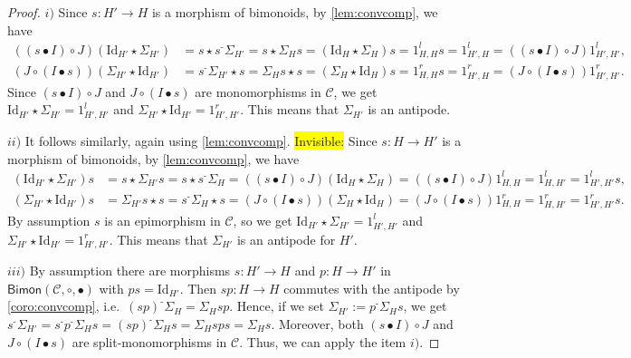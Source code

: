 \documentclass[nosumlimits,twoside]{amsart}
\theoremstyle{definition}
\theoremstyle{remark}
\def\revsn{\text{-}}
\newenvironment{invisible}{{\noindent\sc \colorbox{yellow}{Invisible:}\;}\color{gray}}{\medskip}
\newcommand{\id}{\mathrm{Id}}
\newcommand{\Cc}{\mathcal{C}}
\begin{document}
\begin{proof}
$i)$ Since $s:H'\to H$ is a morphism of bimonoids, by \cref{lem:convcomp}, we have%
\begin{align*}
\left( \left( s\bullet I\right) \circ J\right) \left( \mathrm{Id}_{H'}\star
\Sigma _{H'}\right)  &=s\star s^{\revsn }\Sigma _{H'}=s\star \Sigma _{H}s=\left(
\mathrm{Id}_{H}\star \Sigma _{H}\right) s=1_{H,H}^{l}s=1_{H',H}^{l}=\left(
\left( s\bullet I\right) \circ J\right) 1_{H',H'}^{l}, \\
\left( J\circ \left( I\bullet s\right) \right) \left( \Sigma _{H'}\star
\mathrm{Id}_{H'}\right)  &=s^{\revsn }\Sigma _{H'}\star s=\Sigma _{H}s\star
s=\left( \Sigma _{H}\star \mathrm{Id}_{H}\right)
s=1_{H,H}^{r}s=1_{H',H}^{r}=\left( J\circ \left( I\bullet s\right) \right)
1_{H',H'}^{r}.
\end{align*}
Since $\left( s\bullet I\right) \circ J$ and $J\circ \left( I\bullet s\right)$ are monomorphisms in $\Cc$, we get $\mathrm{Id}_{H'}\star \Sigma _{H'}=1_{H',H'}^{l}$ and $\Sigma _{H'}\star
\mathrm{Id}_{H'}=1_{H',H'}^{r}.$
This means that $\Sigma _{H'}$ is an antipode.

$ii)$ It follows similarly, again using \cref{lem:convcomp}.
\begin{invisible}
Since $s:H\to H'$ is a morphism of bimonoids, by \cref{lem:convcomp}, we have
	\begin{align*}
	 \left( \mathrm{Id}_{H'}\star
		\Sigma _{H'}\right)s  &=s\star \Sigma _{H'}s=s\star s^{\revsn}\Sigma _{H}=	\left( \left( s\bullet I\right) \circ J\right)\left(
		\mathrm{Id}_{H}\star \Sigma _{H}\right) = 	\left( \left( s\bullet I\right) \circ J\right) 1_{H,H}^{l}=1_{H,H'}^{l}= 1_{H',H'}^{l}s, \\
		 \left( \Sigma _{H'}\star
		\mathrm{Id}_{H'}\right) s &=\Sigma _{H'}s\star
		s=s^{\revsn }\Sigma _{H}\star s=\left( J\circ \left( I\bullet s\right) \right)\left( \Sigma _{H}\star \mathrm{Id}_{H}\right)
		=\left( J\circ \left( I\bullet s\right) \right)1_{H,H}^{r}=1_{H,H'}^{r}=1_{H',H'}^{r}s.
	\end{align*}
By assumption $s$ is an epimorphism in $\Cc$, so we get $\mathrm{Id}_{H'}\star \Sigma _{H'}=1_{H',H'}^{l}$ and $\Sigma _{H'}\star \mathrm{Id}_{H'}=1_{H',H'}^{r}.$ This means that $\Sigma _{H'}$ is an antipode for $H'$.    
\end{invisible}


$iii)$ By assumption there are morphisms $s:H'\to H$ and $p:H\to H'$ in $\mathsf{Bimon}(\Cc,\circ,\bullet)$ with $ps=\id_{H'}$. Then $sp:H\to H$ commutes with the antipode by \cref{coro:convcomp}, i.e.\ $(sp)^\revsn\Sigma_H=\Sigma_Hsp$. Hence, if we set $\Sigma_{H'}:=p^\revsn\Sigma_Hs$, we get $s^\revsn\Sigma_{H'}=s^\revsn p^\revsn\Sigma_Hs=(sp)^\revsn\Sigma_Hs=\Sigma_Hsps=\Sigma_{H}s$. Moreover, both $\left( s\bullet I\right) \circ J$ and $J\circ \left( I\bullet s\right)$ are split-monomorphisms in $\Cc$. Thus, we can apply the item $i)$.
\end{proof}
\end{document}
